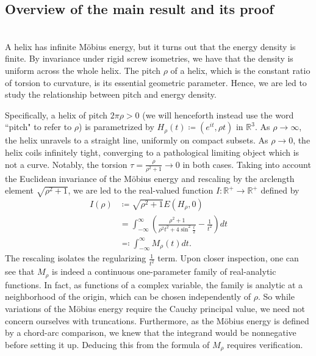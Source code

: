 \documentclass{amsart}
\theoremstyle{plain}
\numberwithin{theorem}{section}
\theoremstyle{definition}
\theoremstyle{remark}
\theoremstyle{brakets}
\newcommand{\R}{\mathbb{R}}
\begin{document}
\subsection{Overview of the main result and its proof}
~\\
A helix has infinite M\"obius energy, but it turns out that the energy density is finite. By invariance under rigid screw isometries, we have that the density is uniform across the whole helix. The pitch $\rho$ of a helix, which is the constant ratio of torsion to curvature, is its essential geometric parameter. Hence, we are led to study the relationship between pitch and energy density.

Specifically, a helix of pitch $2\pi\rho > 0$ (we will henceforth instead use the word ``pitch" to refer to $\rho$) is parametrized by $H_\rho(t) \coloneq (e^{it},\rho t)$ in $\R^3$. As $\rho \to \infty$, the helix unravels to a straight line, uniformly on compact subsets. As $\rho \to 0$, the helix coils infinitely tight, converging to a pathological limiting object which is not a curve. Notably, the torsion $\tau = \frac{\rho}{\rho^2 + 1} \to 0$ in both cases. Taking into account the Euclidean invariance of the M\"obius energy and rescaling by the arclength element $\sqrt{\rho^2 + 1}$, we are led to the real-valued function $I: \R^+ \to \R^+$ defined by
\begin{align*}
    I(\rho) &\coloneq \sqrt{\rho^2 + 1}E(H_\rho,0) \\
    &= \int_{-\infty}^{\infty} \left( \frac{\rho^2 + 1}{\rho^2 t^2 + 4\sin^2 \frac{t}{2}} - \frac{1}{t^2} \right) dt \\
    &\eqqcolon \int_{-\infty}^\infty M_\rho(t)dt.
\end{align*}
The rescaling isolates the regularizing $\frac{1}{t^2}$ term. Upon closer inspection, one can see that $M_\rho$ is indeed a continuous one-parameter family of real-analytic functions. In fact, as functions of a complex variable, the family is analytic at a neighborhood of the origin, which can be chosen independently of $\rho$. So while variations of the M\"obius energy require the Cauchy principal value, we need not concern ourselves with truncations. Furthermore, as the M\"obius energy is defined by a chord-arc comparison, we knew that the integrand would be nonnegative before setting it up. Deducing this from the formula of $M_\rho$ requires verification.
\end{document}
